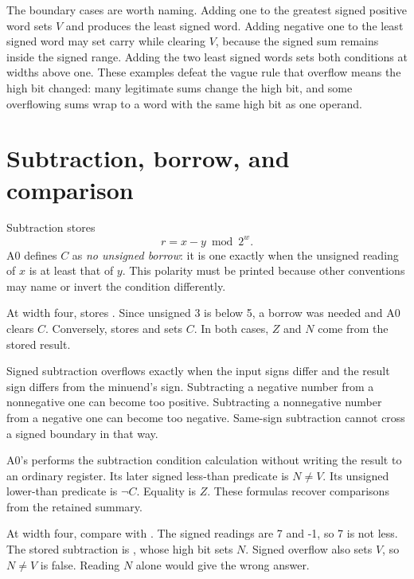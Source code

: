 The boundary cases are worth naming. Adding one to the greatest signed
positive word sets \(V\) and produces the least signed word. Adding negative
one to the least signed word may set carry while clearing \(V\), because the
signed sum remains inside the signed range. Adding the two least signed words sets both
conditions at widths above one. These examples defeat the vague rule that
overflow means the high bit changed: many legitimate sums change the high bit,
and some overflowing sums wrap to a word with the same high bit as one
operand.

\section{Subtraction, borrow, and comparison}

Subtraction stores
\[
  r=x-y\bmod 2^w.
\]
A0 defines \(C\) as \emph{no unsigned borrow}: it is one exactly when the
unsigned reading of \(x\) is at least that of \(y\). This polarity must be
printed because other conventions may name or invert the condition differently.

At width four,  stores . Since unsigned 3 is below
5, a borrow was needed and A0 clears \(C\). Conversely,
 stores  and sets \(C\). In both cases, \(Z\) and
\(N\) come from the stored result.

Signed subtraction overflows exactly when the input signs differ and the
result sign differs from the minuend's sign. Subtracting a negative number
from a nonnegative one can become too positive. Subtracting a nonnegative
number from a negative one can become too negative. Same-sign subtraction
cannot cross a signed boundary in that way.

A0's  performs the subtraction condition calculation without
writing the result to an ordinary register. Its later signed less-than predicate
is \(N\ne V\). Its unsigned lower-than predicate is \(\neg C\). Equality is
\(Z\). These formulas recover comparisons from the retained summary.

\begin{example}[title={Why the sign bit alone is not signed less-than}]
At width four, compare  with . The signed readings are 7
and -1, so 7 is not less. The stored subtraction is
, whose high bit sets \(N\). Signed overflow also sets
\(V\), so \(N\ne V\) is false. Reading \(N\) alone would give the wrong answer.
\end{example}


